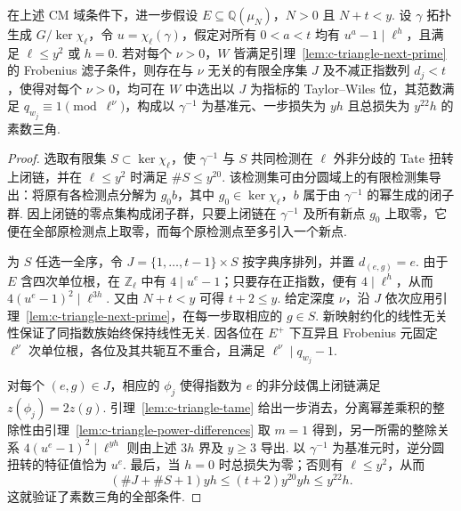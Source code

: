 \begin{theorem}
\label{thm:c-prime-triangle}
\emitthmsource
在上述 CM 域条件下，进一步假设 $E\subseteq\mathbb Q(\mu_N)$，$N>0$ 且 $N+t<y$. 设 $\gamma$ 拓扑生成 $G/\ker\chi_\ell$，令 $u=\chi_\ell(\gamma)$，假定对所有 $0<a<t$ 均有 $u^a-1\mid\ell^h$，且满足 $\ell\le y^2$ 或 $h=0$. 若对每个 $\nu>0$，$W$ 皆满足引理~\ref{lem:c-triangle-next-prime} 的 Frobenius 滤子条件，则存在与 $\nu$ 无关的有限全序集 $J$ 及不减正指数列 $d_j<t$，使得对每个 $\nu>0$，均可在 $W$ 中选出以 $J$ 为指标的 Taylor--Wiles 位，其范数满足 $q_{w_j}\equiv1\pmod{\ell^\nu}$，构成以 $\gamma^{-1}$ 为基准元、一步损失为 $yh$ 且总损失为 $y^{22}h$ 的素数三角.
\end{theorem}
\begin{proof}
选取有限集 $S\subset\ker\chi_\ell$，使 $\gamma^{-1}$ 与 $S$ 共同检测在 $\ell$ 外非分歧的 Tate 扭转上闭链，并在 $\ell\le y^2$ 时满足 $\#S\le y^{20}$. 该检测集可由分圆域上的有限检测集导出：将原有各检测点分解为 $g_0 b$，其中 $g_0\in\ker\chi_\ell$，$b$ 属于由 $\gamma^{-1}$ 的幂生成的闭子群. 因上闭链的零点集构成闭子群，只要上闭链在 $\gamma^{-1}$ 及所有新点 $g_0$ 上取零，它便在全部原检测点上取零，而每个原检测点至多引入一个新点.

为 $S$ 任选一全序，令 $J=\{1,\ldots,t-1\}\times S$ 按字典序排列，并置 $d_{(e,g)}=e$. 由于 $E$ 含四次单位根，在 $\mathbb Z_\ell$ 中有 $4\mid u^e-1$；只要存在正指数，便有 $4\mid\ell^h$，从而 $4(u^e-1)^2\mid\ell^{3h}$. 又由 $N+t<y$ 可得 $t+2\le y$. 给定深度 $\nu$，沿 $J$ 依次应用引理~\ref{lem:c-triangle-next-prime}，在每一步取相应的 $g\in S$. 新映射约化的线性无关性保证了同指数族始终保持线性无关. 因各位在 $E^+$ 下互异且 Frobenius 元固定 $\ell^\nu$ 次单位根，各位及其共轭互不重合，且满足 $\ell^\nu\mid q_{w_j}-1$.

对每个 $(e,g)\in J$，相应的 $\phi_j$ 使得指数为 $e$ 的非分歧偶上闭链满足 $z(\phi_j)=2z(g)$. 引理~\ref{lem:c-triangle-tame} 给出一步消去，分离幂差乘积的整除性由引理~\ref{lem:c-triangle-power-differences} 取 $m=1$ 得到，另一所需的整除关系 $4(u^e-1)^2\mid\ell^{yh}$ 则由上述 $3h$ 界及 $y\ge3$ 导出. 以 $\gamma^{-1}$ 为基准元时，逆分圆扭转的特征值恰为 $u^e$. 最后，当 $h=0$ 时总损失为零；否则有 $\ell\le y^2$，从而
\[
 (\#J+\#S+1)yh\le (t+2)y^{20}yh\le y^{22}h.
\]
这就验证了素数三角的全部条件.
\end{proof}

